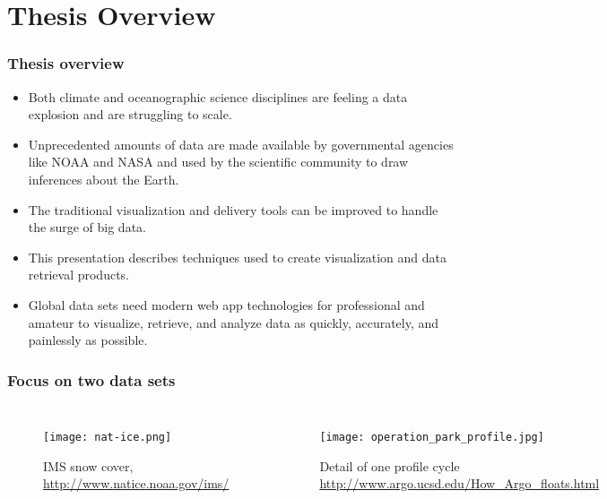

\section{Thesis Overview}
\begin{frame}
\frametitle{Thesis overview}
\begin{itemize}
\item Both climate and oceanographic science disciplines are feeling a data explosion and are struggling to scale. 
\item Unprecedented amounts of data are made available by governmental agencies like NOAA and NASA and used by the scientific community to draw inferences about the Earth. 
\item The traditional visualization and delivery tools can be improved to handle the surge of big data. 
\item This presentation describes techniques used to create visualization and data retrieval products. 
\item Global data sets need modern web app technologies for professional and amateur to visualize, retrieve, and analyze data as quickly, accurately, and painlessly as possible.
\end{itemize}
\end{frame}

\begin{frame}
\frametitle{Focus on two data sets}
\begin{columns}
\begin{figure}
    \centering
    \texttt{[image: nat-ice.png]}
    \caption{\tiny{IMS snow cover, \url{http://www.natice.noaa.gov/ims/}}}
\end{figure}
\begin{figure}
    \centering
    \texttt{[image: operation\_park\_profile.jpg]}
    \caption{\tiny{Detail of one profile cycle \url{http://www.argo.ucsd.edu/How_Argo_floats.html}}}
\end{figure}
\end{columns}
\end{frame}